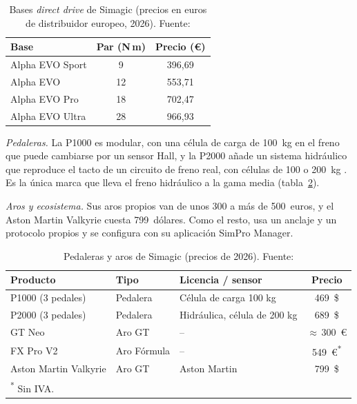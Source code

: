 \begin{table}[htbp]
	\centering
	\caption[Bases \textit{direct drive} de Simagic (precios en euros de distribuidor europeo, 2026)]{Bases \textit{direct drive} de Simagic (precios en euros de distribuidor europeo, 2026). Fuente: \parencite{simagic_web}}
	\label{tab:simagic}
	\small
	\begin{tabular}{|l|c|c|}
		\hline
		\textbf{Base} & \textbf{Par (N\,m)} & \textbf{Precio (\euro)} \\
		\hline
		Alpha EVO Sport & 9  & 396,69 \\
		Alpha EVO       & 12 & 553,71 \\
		Alpha EVO Pro   & 18 & 702,47 \\
		Alpha EVO Ultra & 28 & 966,93 \\
		\hline
	\end{tabular}
\end{table}

\textit{Pedaleras.} La P1000 es modular, con una célula de carga de 100~kg en el freno que puede cambiarse por un sensor Hall, y la P2000 añade un sistema hidráulico que reproduce el tacto de un circuito de freno real, con células de 100 o 200~kg \parencite{simagic_web}. Es la única marca que lleva el freno hidráulico a la gama media (tabla~\ref{tab:simagic-pedales-aros}).

\textit{Aros y ecosistema.} Sus aros propios van de unos 300 a más de 500~euros, y el Aston Martin Valkyrie cuesta 799~dólares. Como el resto, usa un anclaje y un protocolo propios y se configura con su aplicación SimPro Manager.

\begin{table}[htbp]
	\centering
	\caption[Pedaleras y aros de Simagic (precios de 2026)]{Pedaleras y aros de Simagic (precios de 2026). Fuente: \parencite{simagic_web}}
	\label{tab:simagic-pedales-aros}
	\small
	\begin{tabular}{|l|l|l|c|}
		\hline
		\textbf{Producto} & \textbf{Tipo} & \textbf{Licencia / sensor} & \textbf{Precio} \\
		\hline
		P1000 (3 pedales)        & Pedalera     & Célula de carga 100 kg       & 469~\$ \\
		P2000 (3 pedales)        & Pedalera     & Hidráulica, célula de 200 kg & 689~\$ \\
		GT Neo                   & Aro GT       & --                           & $\approx$\,300~\euro \\
		FX Pro V2                & Aro Fórmula  & --                           & 549~\euro\textsuperscript{*} \\
		Aston Martin Valkyrie    & Aro GT       & Aston Martin                 & 799~\$ \\
		\hline
		\multicolumn{4}{l}{\footnotesize \textsuperscript{*} Sin IVA.} \\
	\end{tabular}
\end{table}

